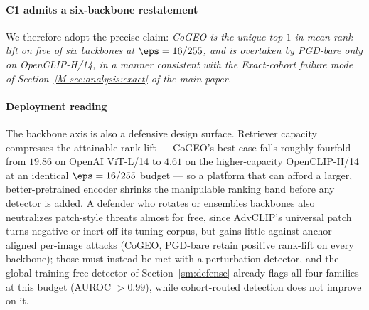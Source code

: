\paragraph{C1 admits a six-backbone restatement} We therefore adopt the precise claim: \emph{CoGEO is the unique top-$1$ in mean rank-lift on five of six backbones at $\eps = 16/255$, and is overtaken by PGD-bare only on OpenCLIP-H/14, in a manner consistent with the Exact-cohort failure mode of Section~\ref{M-sec:analysis:exact} of the main paper.}

\paragraph{Deployment reading} The backbone axis is also a defensive design surface. Retriever capacity compresses the attainable rank-lift --- CoGEO's best case falls roughly fourfold from $19.86$ on OpenAI ViT-L/14 to $4.61$ on the higher-capacity OpenCLIP-H/14 at an identical $\eps = 16/255$ budget --- so a platform that can afford a larger, better-pretrained encoder shrinks the manipulable ranking band before any detector is added. A defender who rotates or ensembles backbones also neutralizes patch-style threats almost for free, since AdvCLIP's universal patch turns negative or inert off its tuning corpus, but gains little against anchor-aligned per-image attacks (CoGEO, PGD-bare retain positive rank-lift on every backbone); those must instead be met with a perturbation detector, and the global training-free detector of Section~\ref{sm:defense} already flags all four families at this budget (AUROC $>0.99$), while cohort-routed detection does not improve on it.

